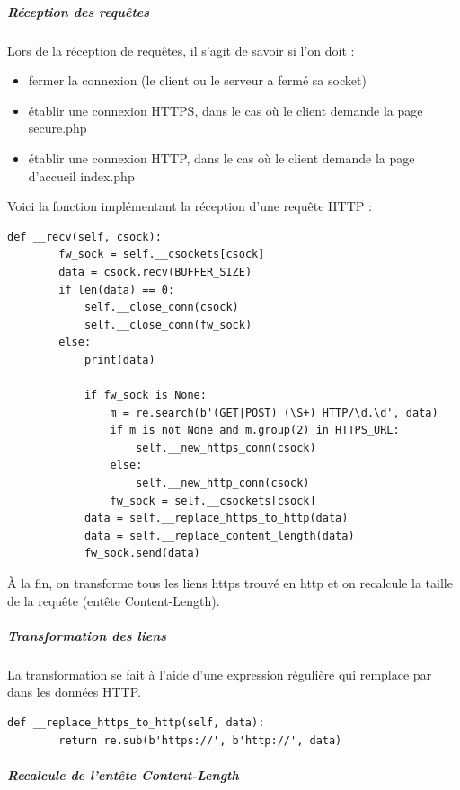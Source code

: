\subparagraph{Réception des requêtes \\}

Lors de la réception de requêtes, il s'agit de savoir si l'on doit :

\begin{itemize}
\item fermer la connexion (le client ou le serveur a fermé sa socket)
\item établir une connexion HTTPS, dans le cas où le client demande la page secure.php
\item établir une connexion HTTP, dans le cas où le client demande la page d'accueil index.php
\end{itemize}

Voici la fonction implémentant la réception d'une requête HTTP :

\begin{verbatim}
def __recv(self, csock):
        fw_sock = self.__csockets[csock]
        data = csock.recv(BUFFER_SIZE)
        if len(data) == 0:
            self.__close_conn(csock)
            self.__close_conn(fw_sock)
        else:
            print(data)

            if fw_sock is None:
                m = re.search(b'(GET|POST) (\S+) HTTP/\d.\d', data)
                if m is not None and m.group(2) in HTTPS_URL:
                    self.__new_https_conn(csock)
                else:
                    self.__new_http_conn(csock)
                fw_sock = self.__csockets[csock]
            data = self.__replace_https_to_http(data)
            data = self.__replace_content_length(data)
            fw_sock.send(data)
\end{verbatim}

À la fin, on transforme tous les liens https trouvé en http et on recalcule la taille de la requête (entête Content-Length).

\subparagraph{Transformation des liens \\}

La transformation se fait à l'aide d'une expression régulière qui remplace  par  dans les données HTTP.

\begin{verbatim}
def __replace_https_to_http(self, data):
        return re.sub(b'https://', b'http://', data)
\end{verbatim}

\subparagraph{Recalcule de l'entête Content-Length \\}

